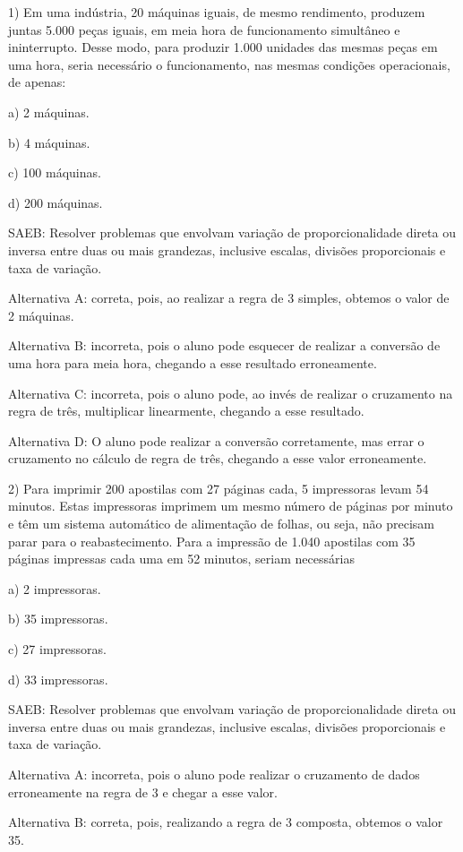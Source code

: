 1) Em uma indústria, 20 máquinas iguais, de mesmo rendimento, produzem
juntas 5.000 peças iguais, em meia hora de funcionamento simultâneo e
ininterrupto. Desse modo, para produzir 1.000 unidades das mesmas peças
em uma hora, seria necessário o funcionamento, nas mesmas condições
operacionais, de apenas:

a) 2 máquinas.

b) 4 máquinas.

c) 100 máquinas.

d) 200 máquinas.

SAEB: Resolver problemas que envolvam variação de proporcionalidade
direta ou inversa entre duas ou mais grandezas, inclusive escalas,
divisões proporcionais e taxa de variação.

Alternativa A: correta, pois, ao realizar a regra de 3 simples, obtemos
o valor de 2 máquinas.

Alternativa B: incorreta, pois o aluno pode esquecer de realizar a
conversão de uma hora para meia hora, chegando a esse resultado
erroneamente.

Alternativa C: incorreta, pois o aluno pode, ao invés de realizar o
cruzamento na regra de três, multiplicar linearmente, chegando a esse
resultado.

Alternativa D: O aluno pode realizar a conversão corretamente, mas errar
o cruzamento no cálculo de regra de três, chegando a esse valor
erroneamente.

2) Para imprimir 200 apostilas com 27 páginas cada, 5 impressoras levam
54 minutos. Estas impressoras imprimem um mesmo número de páginas por
minuto e têm um sistema automático de alimentação de folhas, ou seja,
não precisam parar para o reabastecimento. Para a impressão de 1.040
apostilas com 35 páginas impressas cada uma em 52 minutos, seriam
necessárias

a) 2 impressoras.

b) 35 impressoras.

c) 27 impressoras.

d) 33 impressoras.

SAEB: Resolver problemas que envolvam variação de proporcionalidade
direta ou inversa entre duas ou mais grandezas, inclusive escalas,
divisões proporcionais e taxa de variação.

Alternativa A: incorreta, pois o aluno pode realizar o cruzamento de
dados erroneamente na regra de 3 e chegar a esse valor.

Alternativa B: correta, pois, realizando a regra de 3 composta, obtemos
o valor 35.

